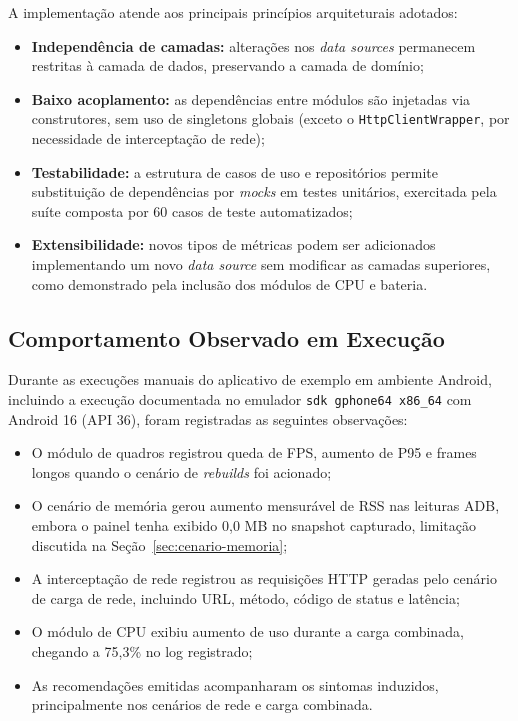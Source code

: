A implementação atende aos principais princípios arquiteturais adotados:

\begin{itemize}
  \item \textbf{Independência de camadas:} alterações nos \textit{data sources} permanecem restritas à camada de dados, preservando a camada de domínio;
  \item \textbf{Baixo acoplamento:} as dependências entre módulos são injetadas via construtores, sem uso de singletons globais (exceto o \texttt{HttpClientWrapper}, por necessidade de interceptação de rede);
  \item \textbf{Testabilidade:} a estrutura de casos de uso e repositórios permite substituição de dependências por \textit{mocks} em testes unitários, exercitada pela suíte composta por 60 casos de teste automatizados;
  \item \textbf{Extensibilidade:} novos tipos de métricas podem ser adicionados implementando um novo \textit{data source} sem modificar as camadas superiores, como demonstrado pela inclusão dos módulos de CPU e bateria.
\end{itemize}

\subsection{Comportamento Observado em Execução}

Durante as execuções manuais do aplicativo de exemplo em ambiente Android, incluindo a execução documentada no emulador \texttt{sdk gphone64 x86\_64} com Android 16 (API 36), foram registradas as seguintes observações:

\begin{itemize}
  \item O módulo de quadros registrou queda de FPS, aumento de P95 e frames longos quando o cenário de \textit{rebuilds} foi acionado;
  \item O cenário de memória gerou aumento mensurável de RSS nas leituras ADB, embora o painel tenha exibido 0{,}0 MB no snapshot capturado, limitação discutida na Seção~\ref{sec:cenario-memoria};
  \item A interceptação de rede registrou as requisições HTTP geradas pelo cenário de carga de rede, incluindo URL, método, código de status e latência;
  \item O módulo de CPU exibiu aumento de uso durante a carga combinada, chegando a 75{,}3\% no log registrado;
  \item As recomendações emitidas acompanharam os sintomas induzidos, principalmente nos cenários de rede e carga combinada.
\end{itemize}

